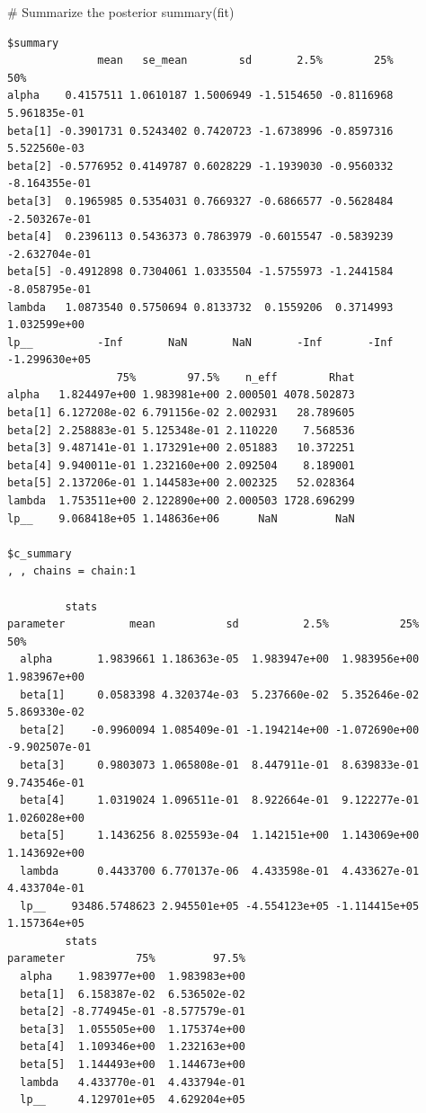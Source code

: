 \documentclass[
  12pt,
]{article}
\newenvironment{Shaded}{\begin{snugshade}}{\end{snugshade}}
\newcommand{\CommentTok}[1]{\textcolor[rgb]{0.37,0.37,0.37}{#1}}
\newcommand{\FunctionTok}[1]{\textcolor[rgb]{0.28,0.35,0.67}{#1}}
\newcommand{\NormalTok}[1]{\textcolor[rgb]{0.00,0.23,0.31}{#1}}
\begin{document}
\begin{Shaded}
\begin{Highlighting}[]
\CommentTok{\# Summarize the posterior}
\FunctionTok{summary}\NormalTok{(fit)}
\end{Highlighting}
\end{Shaded}

\begin{verbatim}
$summary
              mean   se_mean        sd       2.5%        25%           50%
alpha    0.4157511 1.0610187 1.5006949 -1.5154650 -0.8116968  5.961835e-01
beta[1] -0.3901731 0.5243402 0.7420723 -1.6738996 -0.8597316  5.522560e-03
beta[2] -0.5776952 0.4149787 0.6028229 -1.1939030 -0.9560332 -8.164355e-01
beta[3]  0.1965985 0.5354031 0.7669327 -0.6866577 -0.5628484 -2.503267e-01
beta[4]  0.2396113 0.5436373 0.7863979 -0.6015547 -0.5839239 -2.632704e-01
beta[5] -0.4912898 0.7304061 1.0335504 -1.5755973 -1.2441584 -8.058795e-01
lambda   1.0873540 0.5750694 0.8133732  0.1559206  0.3714993  1.032599e+00
lp__          -Inf       NaN       NaN       -Inf       -Inf -1.299630e+05
                 75%        97.5%    n_eff        Rhat
alpha   1.824497e+00 1.983981e+00 2.000501 4078.502873
beta[1] 6.127208e-02 6.791156e-02 2.002931   28.789605
beta[2] 2.258883e-01 5.125348e-01 2.110220    7.568536
beta[3] 9.487141e-01 1.173291e+00 2.051883   10.372251
beta[4] 9.940011e-01 1.232160e+00 2.092504    8.189001
beta[5] 2.137206e-01 1.144583e+00 2.002325   52.028364
lambda  1.753511e+00 2.122890e+00 2.000503 1728.696299
lp__    9.068418e+05 1.148636e+06      NaN         NaN

$c_summary
, , chains = chain:1

         stats
parameter          mean           sd          2.5%           25%           50%
  alpha       1.9839661 1.186363e-05  1.983947e+00  1.983956e+00  1.983967e+00
  beta[1]     0.0583398 4.320374e-03  5.237660e-02  5.352646e-02  5.869330e-02
  beta[2]    -0.9960094 1.085409e-01 -1.194214e+00 -1.072690e+00 -9.902507e-01
  beta[3]     0.9803073 1.065808e-01  8.447911e-01  8.639833e-01  9.743546e-01
  beta[4]     1.0319024 1.096511e-01  8.922664e-01  9.122277e-01  1.026028e+00
  beta[5]     1.1436256 8.025593e-04  1.142151e+00  1.143069e+00  1.143692e+00
  lambda      0.4433700 6.770137e-06  4.433598e-01  4.433627e-01  4.433704e-01
  lp__    93486.5748623 2.945501e+05 -4.554123e+05 -1.114415e+05  1.157364e+05
         stats
parameter           75%         97.5%
  alpha    1.983977e+00  1.983983e+00
  beta[1]  6.158387e-02  6.536502e-02
  beta[2] -8.774945e-01 -8.577579e-01
  beta[3]  1.055505e+00  1.175374e+00
  beta[4]  1.109346e+00  1.232163e+00
  beta[5]  1.144493e+00  1.144673e+00
  lambda   4.433770e-01  4.433794e-01
  lp__     4.129701e+05  4.629204e+05


\end{verbatim}
\end{document}
